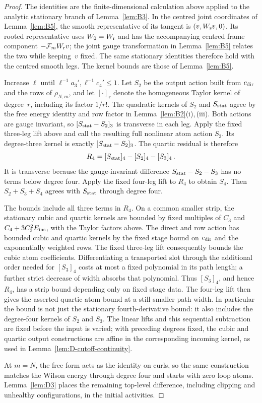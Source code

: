 \begin{proof}
The identities are the finite-dimensional calculation above applied to the analytic stationary branch of Lemma~\ref{lem:B3}. In the centred joint coordinates of Lemma~\ref{lem:B5}, the smooth representative of its tangent is $(v,W_{\rm s}v,0)$. Its rooted representative uses $W_0=W_{\rm r}$ and has the accompanying centred frame component $-\mathcal F_mW_{\rm r}v$; the joint gauge transformation in Lemma~\ref{lem:B5} relates the two while keeping~$v$ fixed. The same stationary identities therefore hold with the centred smooth legs. The kernel bounds are those of Lemma~\ref{lem:B5}.

Increase $\ell$ until $\ell^{-1}a_3',\ell^{-1}c_4'\le1$. Let $S_2$ be the output action built from $c_{\rm dir}$ and the rows of $\rho_{N,m}$, and let $[\cdot]_r$ denote the homogeneous Taylor kernel of degree~$r$, including its factor $1/r!$. The quadratic kernels of $S_2$ and $S_{\rm stat}$ agree by the free energy identity and row factor in Lemma~\ref{lem:B2}(i),\,(iii). Both actions are gauge invariant, so $[S_{\rm stat}-S_2]_3$ is transverse in each leg. Apply the fixed three-leg lift above and call the resulting full nonlinear atom action $S_3$. Its degree-three kernel is exactly $[S_{\rm stat}-S_2]_3$. The quartic residual is therefore
\begin{equation*}
R_4=[S_{\rm stat}]_4-[S_2]_4-[S_3]_4\,.
\end{equation*}
It is transverse because the gauge-invariant difference $S_{\rm stat}-S_2-S_3$ has no terms below degree four. Apply the fixed four-leg lift to $R_4$ to obtain $S_4$. Then $S_2+S_3+S_4$ agrees with $S_{\rm stat}$ through degree four.

The bounds include all three terms in $R_4$. On a common smaller strip, the stationary cubic and quartic kernels are bounded by fixed multiples of $C_3$ and $C_4+3C_3^2E_{\rm ins}$, with the Taylor factors above. The direct and row action has bounded cubic and quartic kernels by the fixed stage bound on $c_{\rm dir}$ and the exponentially weighted rows. The fixed three-leg lift consequently bounds the cubic atom coefficients. Differentiating a transported slot through the additional order needed for $[S_3]_4$ costs at most a fixed polynomial in its path length; a further strict decrease of width absorbs that polynomial. Thus $[S_3]_4$, and hence $R_4$, has a strip bound depending only on fixed stage data. The four-leg lift then gives the asserted quartic atom bound at a still smaller path width. In particular the bound is not just the stationary fourth-derivative bound: it also includes the degree-four kernels of $S_2$ and $S_3$. The linear lifts and this sequential subtraction are fixed before the input is varied; with preceding degrees fixed, the cubic and quartic output constructions are affine in the corresponding incoming kernel, as used in Lemma~\ref{lem:D-cutoff-continuity}.

At $m=N$, the free form acts as the identity on curls, so the same construction matches the Wilson energy through degree four and starts with zero loop atoms. Lemma~\ref{lem:D3} places the remaining top-level difference, including clipping and unhealthy configurations, in the initial activities.
\end{proof}

